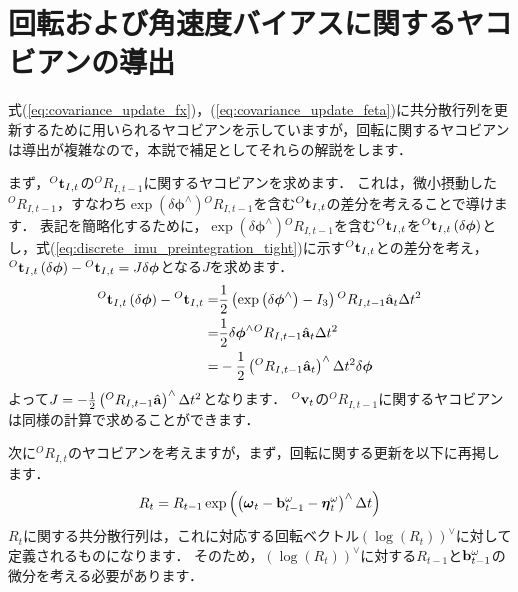 \section{回転および角速度バイアスに関するヤコビアンの導出}
\label{sec:回転および角速度バイアスに関するヤコビアンの導出}

式(\ref{eq:covariance_update_fx})，(\ref{eq:covariance_update_feta})に共分散行列を更新するために用いられるヤコビアンを示していますが，回転に関するヤコビアンは導出が複雑なので，本説で補足としてそれらの解説をします．

まず，${}^{O}{\bf t}_{I, t}$の${}^{O}R_{I, t-1}$に関するヤコビアンを求めます．
これは，微小摂動した${}^{O}R_{I, t-1}$，すなわち$\exp \left( \delta \boldsymbol \phi^{\wedge} \right) {}^{O}R_{I, t-1}$を含む${}^{O}{\bf t}_{I, t}$の差分を考えることで導けます．
表記を簡略化するために，$\exp \left( \delta \boldsymbol \phi^{\wedge} \right) {}^{O}R_{I, t-1}$を含む${}^{O}{\bf t}_{I, t}$を${}^{O}{\bf t}_{I, t} \left( \delta \boldsymbol \phi \right)$とし，式(\ref{eq:discrete_imu_preintegration_tight})に示す${}^{O}{\bf t}_{I, t}$との差分を考え，${}^{O}{\bf t}_{I, t} \left( \delta \boldsymbol \phi \right) - {}^{O}{\bf t}_{I, t} = J \delta \boldsymbol \phi$となる$J$を求めます．
%
\begin{align}
  \begin{split}
    {}^{O}{\bf t}_{I, t} \left( \delta \boldsymbol \phi \right) - {}^{O}{\bf t}_{I, t}
    = &
    \frac{1}{2} \left( \exp \left( \delta \boldsymbol \phi^{\wedge} \right) - I_{3} \right) {}^{O}R_{I, t-1} \hat{ {\bf a} }_{t} \Delta t^{2} \\
    = &
    \frac{1}{2} \delta \boldsymbol \phi^{\wedge} {}^{O}R_{I, t-1} \hat{ {\bf a} }_{t} \Delta t^{2} \\
    = & - \frac{1}{2} \left( {}^{O}R_{I, t-1} \hat{ {\bf a} }_{t} \right)^{\wedge} \Delta t^{2} \delta \boldsymbol \phi
  \end{split}
\end{align}
%
よって$J = - \frac{1}{2} \left( {}^{O}R_{I, t-1} \hat{ {\bf a} } \right)^{\wedge} \Delta t^{2}$となります．
${}^{O}{\bf v}_{t}$の${}^{O}R_{I, t-1}$に関するヤコビアンは同様の計算で求めることができます．

次に${}^{O}R_{I, t}$のヤコビアンを考えますが，まず，回転に関する更新を以下に再掲します．
%
\begin{align}
  R_{t} = R_{t-1} \exp \left( \left( \boldsymbol \omega_{t} - {\bf b}_{t-1}^{\omega} - \boldsymbol \eta_{t}^{\omega} \right)^{\wedge} \Delta t \right)
\end{align}
%
$R_{t}$に関する共分散行列は，これに対応する回転ベクトル$\left( \log \left( R_{t} \right) \right)^{\vee}$に対して定義されるものになります．
そのため，$\left( \log \left( R_{t} \right) \right)^{\vee}$に対する$R_{t-1}$と${\bf b}_{t-1}^{\omega}$の微分を考える必要があります．

